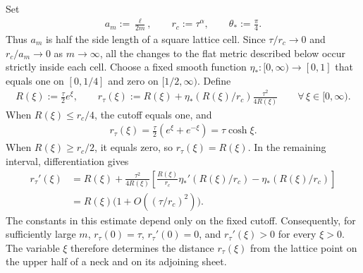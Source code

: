\documentclass[a4paper,11pt,oneside,reqno]{amsart}
\numberwithin{equation}{section}
\theoremstyle{definition}
\begin{document}
Set
%
\begin{align*}
    a_m:=\frac{\ell}{2m},\qquad
    r_c:=\tau^\alpha,\qquad
    \theta_*:=\frac\pi4.
\end{align*}
%
Thus $a_m$ is half the side length of a square lattice
cell. Since $\tau/r_c\to0$ and $r_c/a_m\to0$ as
$m\to\infty$, all the changes to the flat metric described
below occur strictly inside each cell.
Choose a fixed smooth function
$\eta_*:[0,\infty)\to[0,1]$ that equals one on
$[0,1/4]$ and zero on $[1/2,\infty)$. Define
%
\begin{align}
    \label{eq:s4-model-radius}
    R(\xi):=\frac\tau2e^\xi,\qquad
    r_\tau(\xi):=R(\xi)+
    \eta_*(R(\xi)/r_c)\frac{\tau^2}{4R(\xi)}
    \qquad\forall\,\xi\in[0,\infty).
\end{align}
%
When $R(\xi)\leq r_c/4$, the cutoff equals one, and
%
\begin{align*}
    r_\tau(\xi)
    =\frac\tau2(e^\xi+e^{-\xi})
    =\tau\cosh\xi.
\end{align*}
%
When $R(\xi)\geq r_c/2$, it equals zero, so
$r_\tau(\xi)=R(\xi)$. In the remaining interval,
differentiation gives
%
\begin{align*}
    r_\tau'(\xi)
    &=R(\xi)+\frac{\tau^2}{4R(\xi)}
      \left[
        \frac{R(\xi)}{r_c}\eta_*'(R(\xi)/r_c)
        -\eta_*(R(\xi)/r_c)
      \right]\\
    &=R(\xi)\bigl(1+O((\tau/r_c)^2)\bigr).
\end{align*}
%
The constants in this estimate depend only on the fixed
cutoff. Consequently, for sufficiently large $m$,
$r_\tau(0)=\tau$, $r_\tau'(0)=0$, and
$r_\tau'(\xi)>0$ for every $\xi>0$.
The variable $\xi$ therefore determines the distance
$r_\tau(\xi)$ from the lattice point on the upper half
of a neck and on its adjoining sheet.
\end{document}
